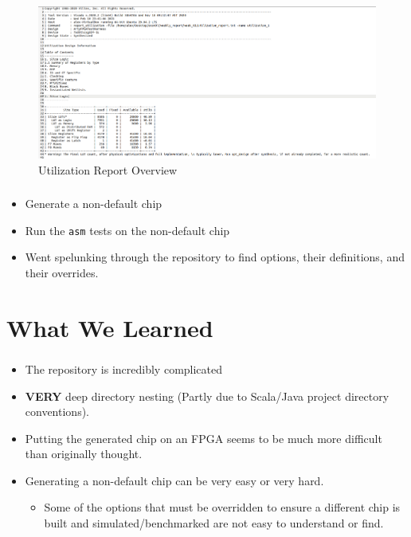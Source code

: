 \documentclass{../weeklyslides}
\begin{document}
\begin{frame}
  \begin{figure}[H]
    \centering
    \includegraphics[width=0.7\linewidth]{Report_Overview}
    \caption{Utilization Report Overview}
    \label{fig:reportoverview}
  \end{figure}
\end{frame}

\begin{frame}
  \frametitle{}
  \begin{itemize}
  \item Generate a non-default chip
  \item Run the \texttt{asm} tests on the non-default chip
  \item Went spelunking through the repository to find options, their definitions, and their overrides.
  \end{itemize}
\end{frame}

\section{What We Learned}\label{sec:What_We_Learned}
\begin{frame}
  \frametitle{}
  \begin{itemize}
  \item The repository is incredibly complicated
  \item \textbf{VERY} deep directory nesting (Partly due to Scala/Java project directory conventions).
  \item Putting the generated chip on an FPGA seems to be much more difficult than originally thought.
  \item Generating a non-default chip can be very easy or very hard.
    \begin{itemize}
    \item Some of the options that must be overridden to ensure a different chip is built and simulated/benchmarked are not easy to understand or find.
    \end{itemize}
  \end{itemize}
\end{frame}
\end{document}
